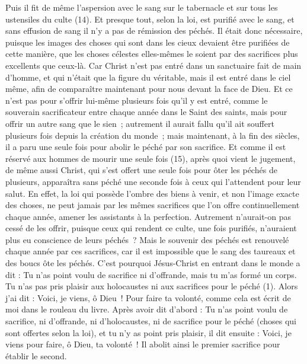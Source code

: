 \begin{multicols}{2}
Puis il fit de même l’aspersion avec le sang sur le tabernacle et sur tous les ustensiles du culte (14).
Et presque tout, selon la loi, est purifié avec le sang, et sans effusion de sang il n’y a pas de rémission des péchés.
Il était donc nécessaire, puisque les images des choses qui sont dans les cieux devaient être purifiées de cette manière, que les choses célestes elles-mêmes le soient par des sacrifices plus excellents que ceux-là.
Car Christ n'est pas entré dans un sanctuaire fait de main d’homme, et qui n’était que la figure du véritable, mais il est entré dans le ciel même, afin de comparaître maintenant pour nous devant la face de Dieu.
Et ce n’est pas pour s’offrir lui-même plusieurs fois qu’il y est entré, comme le souverain sacrificateur entre chaque année dans le Saint des saints, mais pour offrir un autre sang que le sien ;
autrement il aurait fallu qu'il ait souffert plusieurs fois depuis la création du monde ; mais maintenant, à la fin des siècles, il a paru une seule fois pour abolir le péché par son sacrifice.
Et comme il est réservé aux hommes de mourir une seule fois (15), après quoi vient le jugement,
de même aussi Christ, qui s’est offert une seule fois pour ôter les péchés de plusieurs, apparaîtra sans péché une seconde fois à ceux qui l'attendent pour leur salut.
\VerseOne{}En effet, la loi qui possède l'ombre des biens à venir, et non l’image exacte des choses, ne peut jamais par les mêmes sacrifices que l'on offre continuellement chaque année, amener les assistants à la perfection.
Autrement n’aurait-on pas cessé de les offrir, puisque ceux qui rendent ce culte, une fois purifiés, n’auraient plus eu conscience de leurs péchés ?
Mais le souvenir des péchés est renouvelé chaque année par ces sacrifices,
car il est impossible que le sang des taureaux et des boucs ôte les péchés.
C'est pourquoi Jésus-Christ en entrant dans le monde a dit : Tu n'as point voulu de sacrifice ni d'offrande, mais tu m'as formé un corps.
Tu n'as pas pris plaisir aux holocaustes ni aux sacrifices pour le péché (1).
Alors j'ai dit : Voici, je viens, ô Dieu ! Pour faire ta volonté, comme cela est écrit de moi dans le rouleau du livre.
Après avoir dit d’abord : Tu n'as point voulu de sacrifice, ni d'offrande, ni d'holocaustes, ni de sacrifice pour le péché (choses qui sont offertes selon la loi), et tu n'y as point pris plaisir, il dit ensuite : Voici, je viens pour faire, ô Dieu, ta volonté !
Il abolit ainsi le premier sacrifice pour établir le second.

\end{multicols}
